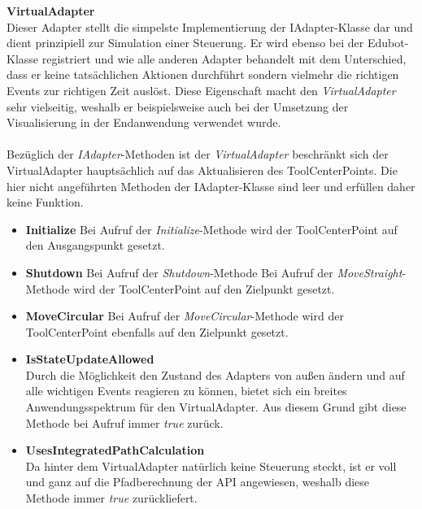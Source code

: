 \textbf{VirtualAdapter}\\
Dieser Adapter stellt die simpelste Implementierung der IAdapter-Klasse dar und dient prinzipiell zur Simulation einer Steuerung. Er wird ebenso bei der Edubot-Klasse registriert und wie alle anderen Adapter behandelt mit dem Unterschied, dass er keine tatsächlichen Aktionen durchführt sondern vielmehr die richtigen Events zur richtigen Zeit auslöst. Diese Eigenschaft macht den \textit{VirtualAdapter} sehr vielseitig, weshalb er beispielsweise auch bei der Umsetzung der Visualisierung in der Endanwendung verwendet wurde.\\
\\
Bezüglich der \textit{IAdapter}-Methoden ist der \textit{VirtualAdapter} beschränkt sich der VirtualAdapter hauptsächlich auf das Aktualisieren des ToolCenterPoints. Die hier nicht angeführten Methoden der IAdapter-Klasse sind leer und erfüllen daher keine Funktion.
\begin{itemize}
\item \textbf{Initialize}
\newline
Bei Aufruf der \textit{Initialize}-Methode wird der ToolCenterPoint auf den Ausgangspunkt gesetzt.
\item \textbf{Shutdown}
\newline
Bei Aufruf der \textit{Shutdown}-Methode 
\newline
Bei Aufruf der \textit{MoveStraight}-Methode wird der ToolCenterPoint auf den Zielpunkt gesetzt.
\item \textbf{MoveCircular}
\newline
Bei Aufruf der \textit{MoveCircular}-Methode wird der ToolCenterPoint ebenfalls auf den Zielpunkt gesetzt.
\newline
\item \textbf{IsStateUpdateAllowed}\\
Durch die Möglichkeit den Zustand des Adapters von außen ändern und auf alle wichtigen Events reagieren zu können, bietet sich ein breites Anwendungsspektrum für den VirtualAdapter. Aus diesem Grund gibt diese Methode bei Aufruf immer \textit{true} zurück.
\item \textbf{UsesIntegratedPathCalculation}\\
Da hinter dem VirtualAdapter natürlich keine Steuerung steckt, ist er voll und ganz auf die Pfadberechnung der API angewiesen, weshalb diese Methode immer \textit{true} zurückliefert.
\end{itemize}



